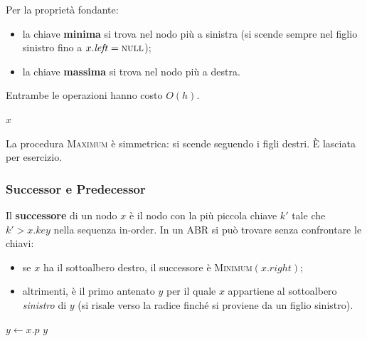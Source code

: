 Per la proprietà fondante:
\begin{itemize}
	\item la chiave \textbf{minima} si trova nel nodo più a sinistra (si scende sempre
	nel figlio sinistro fino a $x.\mathit{left} = \textsc{null}$);
	\item la chiave \textbf{massima} si trova nel nodo più a destra.
\end{itemize}
Entrambe le operazioni hanno costo $O(h)$.

\begin{algorithm}[H]
	\caption{\textsc{Minimum}$(x)$}
	\Return $x$\;
\end{algorithm}

\begin{nota}
	La procedura \textsc{Maximum} è simmetrica: si scende seguendo i figli destri.
	È lasciata per esercizio.
\end{nota}

\subsubsection{Successor e Predecessor}
\label{subsub:succpred}

\begin{definizione}[Successore]
	Il \textbf{successore} di un nodo $x$ è il nodo con la più piccola chiave $k'$ tale
	che $k' > x.\mathit{key}$ nella sequenza in-order. In un ABR si può trovare senza
	confrontare le chiavi:
	\begin{itemize}
		\item se $x$ ha il sottoalbero destro, il successore è
		\textsc{Minimum}$(x.\mathit{right})$;
		\item altrimenti, è il primo antenato $y$ per il quale $x$ appartiene al sottoalbero
		\emph{sinistro} di $y$ (si risale verso la radice finché si proviene da un
		figlio sinistro).
	\end{itemize}
\end{definizione}

\begin{algorithm}[H]
	\caption{\textsc{Successor}$(x)$}
	$y \leftarrow x.p$\;
	\Return $y$\;
\end{algorithm}

